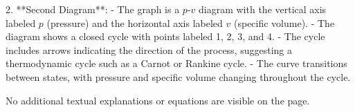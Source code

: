 2. **Second Diagram**:  
   - The graph is a \( p \)-\( v \) diagram with the vertical axis labeled \( p \) (pressure) and the horizontal axis labeled \( v \) (specific volume).  
   - The diagram shows a closed cycle with points labeled 1, 2, 3, and 4.  
   - The cycle includes arrows indicating the direction of the process, suggesting a thermodynamic cycle such as a Carnot or Rankine cycle.  
   - The curve transitions between states, with pressure and specific volume changing throughout the cycle.  

No additional textual explanations or equations are visible on the page.